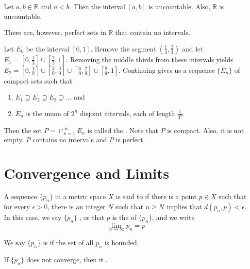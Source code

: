 \documentclass{jacky}
\newcommand{\rr}{\mathbb{R}}
\begin{document}
\begin{prop}
  Let $a,b\in\rr$ and $a<b$. Then the interval $[a,b]$ is uncountable. Also,
  $\rr$ is uncountable.
\end{prop}

\begin{note}
  There are, however, perfect sets in $\rr$ that contain no intervals.
\end{note}

\begin{ex}
  Let $E_0$ be the interval $[0,1]$. Remove the segment
  $(\frac{1}{3},\frac{2}{3})$ and let $E_1=[0,\frac{1}{3}]
  \cup[\frac{2}{3},1]$. Removing the middle thirds from these intervals yields
  $E_2=[0,\frac{1}{9}] \cup[\frac{2}{9},\frac{3}{9}]
  \cup[\frac{6}{9},\frac{7}{9}] \cup[\frac{8}{9},1]$. Continuing gives us a
  sequence $\{E_n\}$ of compact sets such that
  \begin{enumerate}
    \item $E_1\supseteq E_2\supseteq E_3\supseteq\ldots$ and
    \item $E_n$ is the union of $2^n$ disjoint intervals, each of length
      $\frac{1}{3^n}$.
  \end{enumerate}
  Then the set $P=\cap_{n=1}^\infty E_n$ is called the .
  Note that $P$ is compact. Also, it is not empty. $P$ contains no intervals
  and $P$ is perfect.
\end{ex}

\section*{Convergence and Limits}

\begin{bdefi}
  A sequence $\{p_n\}$ in a metric space $X$ is said to  if
  there is a point $p\in X$ such that for every $\epsilon>0$, there is an
  integer $N$ such that $n\ge N$ implies that $d(p_n,p)<\epsilon$. In this
  case, we say $\{p_n\}$ , or that $p$ is the
   of $\{p_n\}$, and we write
  $$\lim_{n\to\infty}p_n=p$$
\end{bdefi}

\begin{defi}
  We say $\{p_n\}$ is  if the set of all $p_n$ is bounded.
\end{defi}

\begin{defi}
  If $\{p_n\}$ does not converge, then it .
\end{defi}
\end{document}
